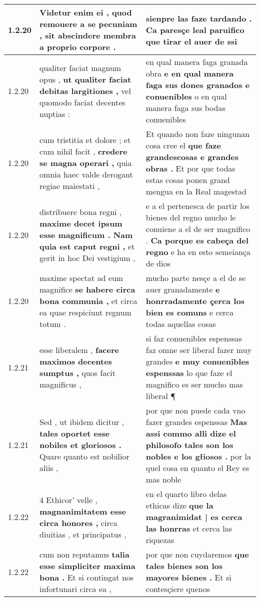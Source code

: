 \begin{tabular}{|p{1cm}|p{6.5cm}|p{6.5cm}|}
1.2.20 & Videtur enim ei , \textbf{ quod remouere a se pecuniam , } sit abscindere membra a proprio corpore . & sienpre las faze tardando . \textbf{ Ca paresçe leal paruifico } que tirar el auer de ssi \\\hline
1.2.20 & qualiter faciat magnum opus , \textbf{ ut qualiter faciat debitas largitiones , } vel quomodo faciat decentes nuptias : & en qual manera faga granada obra \textbf{ e en qual manera faga sus dones granados e conuenibles } o en qual manera faga sus bodas conuenibles \\\hline
1.2.20 & cum tristitia et dolore ; et cum nihil facit , \textbf{ credere se magna operari , } quia omnia haec valde derogant regiae maiestati , & Et quando non faze ningunan cosa cree el \textbf{ que faze grandescosas e grandes obras . } Et por que todas estas cosas ponen grand mengua en la Real magestad \\\hline
1.2.20 & distribuere bona regni , \textbf{ maxime decet ipsum esse magnificum . Nam quia est caput regni , } et gerit in hoc Dei vestigium , & e a el pertenesca de partir los bienes del regno mucho le conuiene a el de ser magnifico . \textbf{ Ca porque es cabeça del regno } e ha en esto semeiança de dios \\\hline
1.2.20 & maxime spectat ad eum magnifice \textbf{ se habere circa bona communia , } et circa ea quae respiciunt regnum totum . & mucho parte nesçe a el de se auer granadamente \textbf{ e honrradamente çerca los bien es comuns } e cerca todas aquellas cosas \\\hline
1.2.21 & esse liberalem , \textbf{ facere maximos decentes sumptus , } quos facit magnificus , & si faz conuenibles espenssas faz omne ser liberal fazer muy grandes \textbf{ e muy conuenibles espenssas } lo que faze el magnifico es ser mucho mas liberal ¶ \\\hline
1.2.21 & Sed , ut ibidem dicitur , \textbf{ tales oportet esse nobiles et gloriosos . } Quare quanto est nobilior aliis , & por que non puede cada vno fazer grandes espenssas \textbf{ Mas assi commo alli dize el philosofo tales son los nobles e los głiosos . } por la quel cosa en quanto el Rey es mas noble \\\hline
1.2.22 & 4 Ethicor’ velle , \textbf{ magnanimitatem esse circa honores , } circa diuitias , et principatus , & en el quarto libro delas ethicas dize \textbf{ que la magranimidat | es cerca las honrras } et cerca las riquezas \\\hline
1.2.22 & cum non reputamus \textbf{ talia esse simpliciter maxima bona . } Et si contingat nos infortunari circa ea , & por que non cuydaremos \textbf{ que tales bienes son los mayores bienes . } Et si contesçiere quenos \\\hline

\end{tabular}
